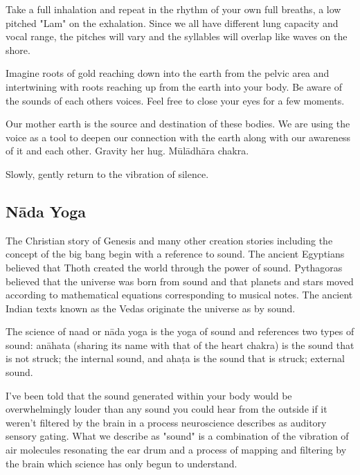 \documentclass[12pt]{article}
\begin{document}
Take a full inhalation and repeat in the rhythm of your own full breaths, a low pitched "Lam" on the exhalation. Since we all have different lung capacity and vocal range, the pitches will vary and the syllables will overlap like waves on the shore.

Imagine roots of gold reaching down into the earth from the pelvic area and intertwining with roots reaching up from the earth into your body. Be aware of the sounds of each others voices. Feel free to close your eyes for a few moments.

Our mother earth is the source and destination of these bodies. We are using the voice as a tool to deepen our connection with the earth along with our awareness of it and each other. Gravity her hug. Mūlādhāra chakra.

Slowly, gently return to the vibration of silence.

\subsection*{Nāda Yoga}

The Christian story of Genesis and many other creation stories including the concept of the big bang begin with a reference to sound. The ancient Egyptians believed that Thoth created the world through the power of sound. Pythagoras believed that the universe was born from sound and that planets and stars moved according to mathematical equations corresponding to musical notes. The ancient Indian texts known as the Vedas originate the universe as by sound.

The science of naad or nāda yoga is the yoga of sound and references two types of sound: anāhata (sharing its name with that of the heart chakra) is the sound that is not struck; the internal sound, and ahaṭa is the sound that is struck; external sound.



I've been told that the sound generated within your body would be overwhelmingly louder than any sound you could hear from the outside if it weren't filtered by the brain in a process neuroscience describes as auditory sensory gating. What we describe as "sound" is a combination of the vibration of air molecules resonating the ear drum and a process of mapping and filtering by the brain which science has only begun to understand.
\end{document}
